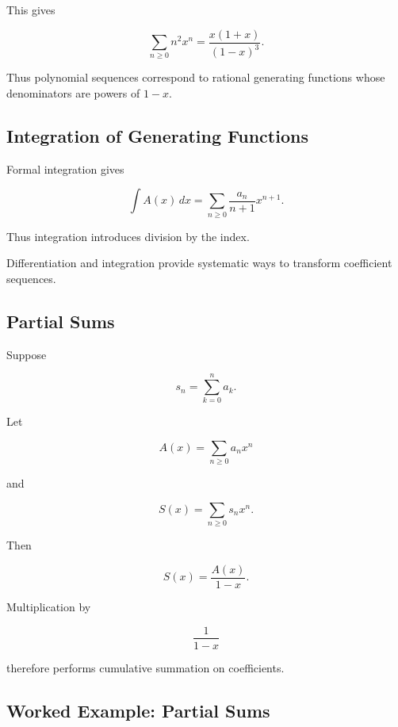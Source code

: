 This gives

\[
\sum_{n\geq0}n^2x^n
=
\boxed{
\frac{x(1+x)}{(1-x)^3}.
}
\]

Thus polynomial sequences correspond to rational generating functions
whose denominators are powers of \(1-x\).

\subsection{Integration of Generating Functions}
\label{subsec:integration-generating-functions}

Formal integration gives

\[
\int A(x)\,dx
=
\sum_{n\geq0}
\frac{a_n}{n+1}x^{n+1}.
\]

Thus integration introduces division by the index.

Differentiation and integration provide systematic ways to transform
coefficient sequences.

\subsection{Partial Sums}
\label{subsec:gf-partial-sums}

Suppose

\[
s_n
=
\sum_{k=0}^{n}a_k.
\]

Let

\[
A(x)
=
\sum_{n\geq0}a_nx^n
\]

and

\[
S(x)
=
\sum_{n\geq0}s_nx^n.
\]

Then

\[
\boxed{
S(x)
=
\frac{A(x)}{1-x}.
}
\]

Multiplication by

\[
\frac{1}{1-x}
\]

therefore performs cumulative summation on coefficients.

\subsection{Worked Example: Partial Sums}
\label{subsec:worked-partial-sums}

